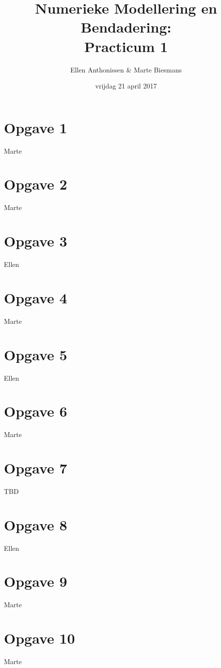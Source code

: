 \documentclass[a4paper]{article}
\title{Numerieke Modellering en Bendadering:\\
	Practicum 1}
\author{Ellen Anthonissen & Marte Biesmans}
\date{vrijdag 21 april 2017}
\newcommand{\opgave}[1]{\section*{Opgave #1}}
\begin{document}
\maketitle
\opgave{1}

Marte

\opgave{2}

Marte

\opgave{3}
Ellen

\opgave{4}

Marte

\opgave{5}
Ellen

\opgave{6}

Marte

\opgave{7}
TBD

\opgave{8}
Ellen

\opgave{9}

Marte

\opgave{10}

Marte
\end{document}
